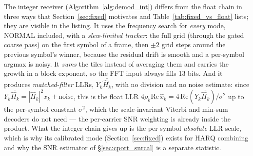 The integer receiver (Algorithm~\ref{alg:demod_int}) differs from the
float chain in three ways that Section~\ref{sec:fixed} motivates and
Table~\ref{tab:fixed_vs_float} lists; they are visible in the listing.
It uses the frequency search for \emph{every} mode, NORMAL included,
with a \emph{slew-limited tracker}: the full grid (through the gated
coarse pass) on the first symbol of a frame, then $\pm 2$ grid steps
around the previous symbol's winner, because the residual drift is
smooth and a per-symbol argmax is noisy.  It \emph{sums} the tiles
instead of averaging them and carries the growth in a block exponent,
so the FFT input always fills 13 bits.  And it produces
\emph{matched-filter} LLRs, $Y_k \overline{\hat H_k}$, with no division
and no noise estimate: since $Y_k \overline{\hat H_k} = |\hat H_k|^2
x_k + \text{noise}$, this is the float LLR $4\rho_k \mathrm{Re}\,\hat
x_k = 4\,\mathrm{Re}(Y_k \overline{\hat H_k})/\sigma^2$ up to the
per-symbol constant $\sigma^2$, which the scale-invariant Viterbi and
min-sum decoders do not need --- the per-carrier SNR weighting is
already inside the product.  What the integer chain gives up is the
per-symbol \emph{absolute} LLR scale, which is why its calibrated mode
(Section~\ref{sec:fixed}) exists for HARQ combining and why the SNR
estimator of \S\ref{sec:cport_snrcal} is a separate statistic.

